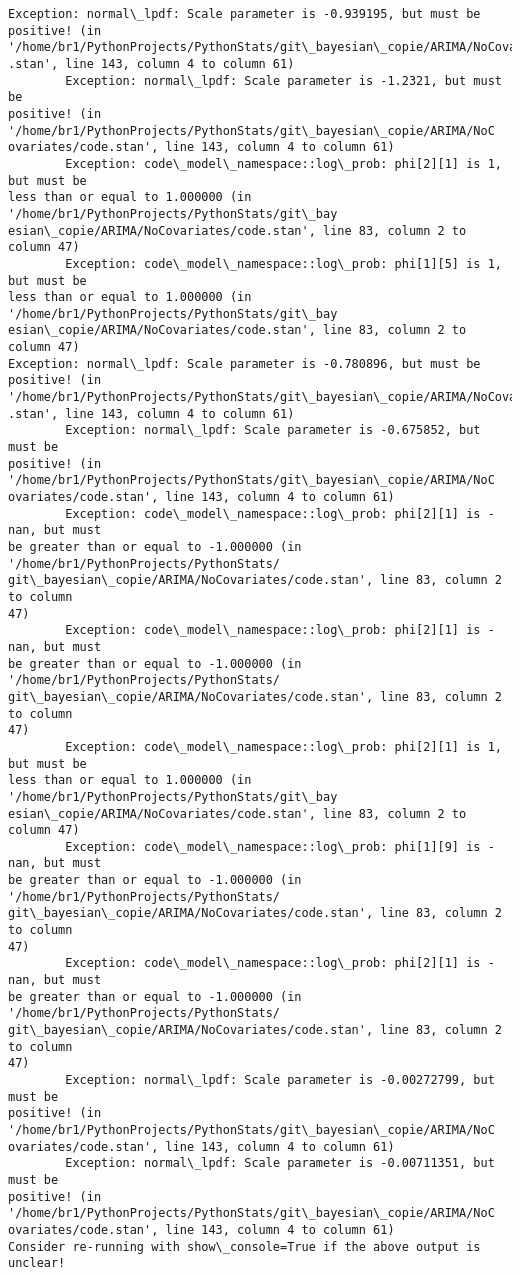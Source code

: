 \documentclass[11pt]{article}
\begin{document}
\begin{Verbatim}[commandchars=\\\{\}]
Exception: normal\_lpdf: Scale parameter is -0.939195, but must be positive! (in 
'/home/br1/PythonProjects/PythonStats/git\_bayesian\_copie/ARIMA/NoCovariates/code
.stan', line 143, column 4 to column 61)
        Exception: normal\_lpdf: Scale parameter is -1.2321, but must be
positive! (in '/home/br1/PythonProjects/PythonStats/git\_bayesian\_copie/ARIMA/NoC
ovariates/code.stan', line 143, column 4 to column 61)
        Exception: code\_model\_namespace::log\_prob: phi[2][1] is 1, but must be
less than or equal to 1.000000 (in '/home/br1/PythonProjects/PythonStats/git\_bay
esian\_copie/ARIMA/NoCovariates/code.stan', line 83, column 2 to column 47)
        Exception: code\_model\_namespace::log\_prob: phi[1][5] is 1, but must be
less than or equal to 1.000000 (in '/home/br1/PythonProjects/PythonStats/git\_bay
esian\_copie/ARIMA/NoCovariates/code.stan', line 83, column 2 to column 47)
Exception: normal\_lpdf: Scale parameter is -0.780896, but must be positive! (in 
'/home/br1/PythonProjects/PythonStats/git\_bayesian\_copie/ARIMA/NoCovariates/code
.stan', line 143, column 4 to column 61)
        Exception: normal\_lpdf: Scale parameter is -0.675852, but must be
positive! (in '/home/br1/PythonProjects/PythonStats/git\_bayesian\_copie/ARIMA/NoC
ovariates/code.stan', line 143, column 4 to column 61)
        Exception: code\_model\_namespace::log\_prob: phi[2][1] is -nan, but must
be greater than or equal to -1.000000 (in '/home/br1/PythonProjects/PythonStats/
git\_bayesian\_copie/ARIMA/NoCovariates/code.stan', line 83, column 2 to column
47)
        Exception: code\_model\_namespace::log\_prob: phi[2][1] is -nan, but must
be greater than or equal to -1.000000 (in '/home/br1/PythonProjects/PythonStats/
git\_bayesian\_copie/ARIMA/NoCovariates/code.stan', line 83, column 2 to column
47)
        Exception: code\_model\_namespace::log\_prob: phi[2][1] is 1, but must be
less than or equal to 1.000000 (in '/home/br1/PythonProjects/PythonStats/git\_bay
esian\_copie/ARIMA/NoCovariates/code.stan', line 83, column 2 to column 47)
        Exception: code\_model\_namespace::log\_prob: phi[1][9] is -nan, but must
be greater than or equal to -1.000000 (in '/home/br1/PythonProjects/PythonStats/
git\_bayesian\_copie/ARIMA/NoCovariates/code.stan', line 83, column 2 to column
47)
        Exception: code\_model\_namespace::log\_prob: phi[2][1] is -nan, but must
be greater than or equal to -1.000000 (in '/home/br1/PythonProjects/PythonStats/
git\_bayesian\_copie/ARIMA/NoCovariates/code.stan', line 83, column 2 to column
47)
        Exception: normal\_lpdf: Scale parameter is -0.00272799, but must be
positive! (in '/home/br1/PythonProjects/PythonStats/git\_bayesian\_copie/ARIMA/NoC
ovariates/code.stan', line 143, column 4 to column 61)
        Exception: normal\_lpdf: Scale parameter is -0.00711351, but must be
positive! (in '/home/br1/PythonProjects/PythonStats/git\_bayesian\_copie/ARIMA/NoC
ovariates/code.stan', line 143, column 4 to column 61)
Consider re-running with show\_console=True if the above output is unclear!
    \end{Verbatim}
\end{document}
